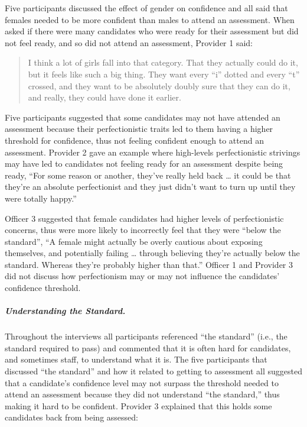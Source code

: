 \documentclass[
  12pt,
  a4paper,
]{book}
\begin{document}
Five participants discussed the effect of gender on confidence and all said that females needed to be more confident than males to attend an assessment. When asked if there were many candidates who were ready for their assessment but did not feel ready, and so did not attend an assessment, Provider 1 said:

\begin{quote}
I think a lot of girls fall into that category. That they actually could do it, but it feels like such a big thing. They want every ``i'' dotted and every ``t'' crossed, and they want to be absolutely doubly sure that they can do it, and really, they could have done it earlier.
\end{quote}

Five participants suggested that some candidates may not have attended an assessment because their perfectionistic traits led to them having a higher threshold for confidence, thus not feeling confident enough to attend an assessment. Provider 2 gave an example where high-levels perfectionistic strivings may have led to candidates not feeling ready for an assessment despite being ready, ``For some reason or another, they've really held back \ldots{} it could be that they're an absolute perfectionist and they just didn't want to turn up until they were totally happy.''

Officer 3 suggested that female candidates had higher levels of perfectionistic concerns, thus were more likely to incorrectly feel that they were ``below the standard'', ``A female might actually be overly cautious about exposing themselves, and potentially failing \ldots{} through believing they're actually below the standard. Whereas they're probably higher than that.'' Officer 1 and Provider 3 did not discuss how perfectionism may or may not influence the candidates' confidence threshold.

\hypertarget{ml-qualitative-gta-understanding-the-standard}{%
\subparagraph{Understanding the Standard.}\label{ml-qualitative-gta-understanding-the-standard}}

Throughout the interviews all participants referenced ``the standard'' (i.e., the standard required to pass) and commented that it is often hard for candidates, and sometimes staff, to understand what it is. The five participants that discussed ``the standard'' and how it related to getting to assessment all suggested that a candidate's confidence level may not surpass the threshold needed to attend an assessment because they did not understand ``the standard,'' thus making it hard to be confident. Provider 3 explained that this holds some candidates back from being assessed:
\end{document}
